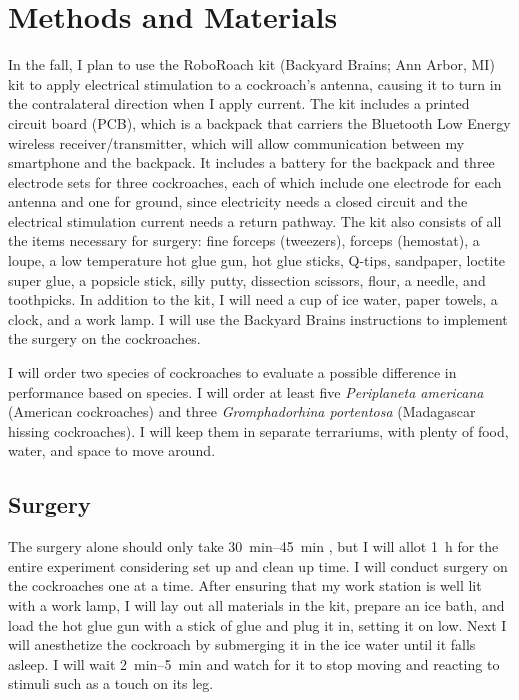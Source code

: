 \section{Methods and Materials}
\label{sec:methods}

In the fall, I plan to use the RoboRoach kit (Backyard Brains; Ann Arbor, MI) kit to apply electrical stimulation to a cockroach's antenna, causing it to turn in the contralateral direction when I apply current. The kit includes a printed circuit board (PCB), which is a backpack that carriers the Bluetooth Low Energy wireless receiver/transmitter, which will allow communication between my smartphone and the backpack. It includes a battery for the backpack and three electrode sets for three cockroaches, each of which include one electrode for each antenna and one for ground, since electricity needs a closed circuit and the electrical stimulation current needs a return pathway. The kit also consists of all the items necessary for surgery: fine forceps (tweezers), forceps (hemostat), a loupe, a low temperature hot glue gun, hot glue sticks, Q-tips, sandpaper, loctite super glue, a popsicle stick, silly putty, dissection scissors, flour, a needle, and toothpicks. In addition to the kit, I will need a cup of ice water, paper towels, a clock, and a work lamp. I will use the Backyard Brains instructions to implement the surgery on the cockroaches.

I will order two species of cockroaches to evaluate a possible difference in performance based on species. I will order at least five \emph{Periplaneta americana} (American cockroaches) and three \emph{Gromphadorhina portentosa} (Madagascar hissing cockroaches). I will keep them in separate terrariums, with plenty of food, water, and space to move around.

\subsection{Surgery}
The surgery alone should only take \SIrange{30}{45}{\minute} , but I will allot \SI{1}{\hour} for the entire experiment considering set up and clean up time. I will conduct surgery on the cockroaches one at a time. After ensuring that my work station is well lit with a work lamp, I will lay out all materials in the kit, prepare an ice bath, and load the hot glue gun with a stick of glue and plug it in, setting it on low. Next I will anesthetize the cockroach by submerging it in the ice water until it falls asleep. I will wait \SIrange{2}{5}{\minute} and watch for it to stop moving and reacting to stimuli such as a touch on its leg.

